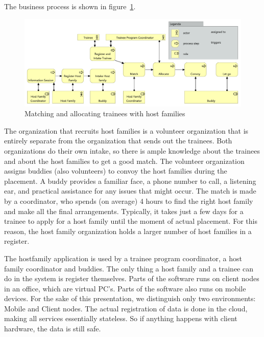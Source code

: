 \documentclass[sn-vancouver]{sn-jnl}%
\theoremstyle{thmstyleone}%
\theoremstyle{thmstyletwo}%
\theoremstyle{thmstylethree}%
\begin{document}
The business process is shown in figure~\ref{fig: Business Process}.
\begin{figure}[hbtp]
 \centering
\includegraphics[clip=true, scale=0.5]{Business Process with legend.pdf}
\caption{Matching and allocating trainees with host families}
\label{fig: Business Process}
\end{figure}
The organization that recruits host families is a volunteer organization that is entirely separate from the organization that sends out the trainees.
Both organizations do their own intake, so there is ample knowledge about the trainees and about the host families to get a good match.
The volunteer organization assigns buddies (also volunteers) to convoy the host families during the placement.
A buddy provides a familiar face, a phone number to call, a listening ear, and practical assistance for any issues that might occur.
The match is made by a coordinator, who spends (on average) 4 hours to find the right host family and make all the final arrangements.
Typically, it takes just a few days for a trainee to apply for a host family until the moment of actual placement.
For this reason, the host family organization holds a larger number of host families in a register.

The hostfamily application is used by a trainee program coordinator, a host family coordinator and buddies.
The only thing a host family and a trainee can do in the system is register themselves.
Parts of the software runs on client nodes in an office, which are virtual PC's.
Parts of the software also runs on mobile devices.
For the sake of this presentation, we distinguish only two environments: Mobile and Client nodes.
The actual registration of data is done in the cloud, making all services essentially stateless.
So if anything happens with client hardware, the data is still safe.
\end{document}
